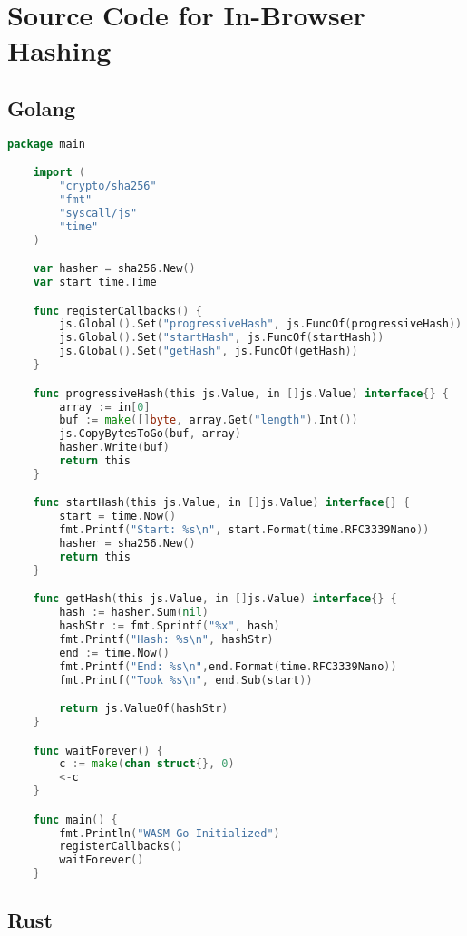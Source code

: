 \chapter{Source Code for In-Browser Hashing}
\label{ch:appendix-in-browser-hashing-code}

\section{Golang}\label{sec:golang}

\begin{lstlisting}[language=Go]
    package main

    import (
        "crypto/sha256"
        "fmt"
        "syscall/js"
        "time"
    )

    var hasher = sha256.New()
    var start time.Time

    func registerCallbacks() {
        js.Global().Set("progressiveHash", js.FuncOf(progressiveHash))
        js.Global().Set("startHash", js.FuncOf(startHash))
        js.Global().Set("getHash", js.FuncOf(getHash))
    }

    func progressiveHash(this js.Value, in []js.Value) interface{} {
        array := in[0]
        buf := make([]byte, array.Get("length").Int())
        js.CopyBytesToGo(buf, array)
        hasher.Write(buf)
        return this
    }

    func startHash(this js.Value, in []js.Value) interface{} {
        start = time.Now()
        fmt.Printf("Start: %s\n", start.Format(time.RFC3339Nano))
        hasher = sha256.New()
        return this
    }

    func getHash(this js.Value, in []js.Value) interface{} {
        hash := hasher.Sum(nil)
        hashStr := fmt.Sprintf("%x", hash)
        fmt.Printf("Hash: %s\n", hashStr)
        end := time.Now()
        fmt.Printf("End: %s\n",end.Format(time.RFC3339Nano))
        fmt.Printf("Took %s\n", end.Sub(start))

        return js.ValueOf(hashStr)
    }

    func waitForever() {
        c := make(chan struct{}, 0)
        <-c
    }

    func main() {
        fmt.Println("WASM Go Initialized")
        registerCallbacks()
        waitForever()
    }
\end{lstlisting}


\section{Rust}

